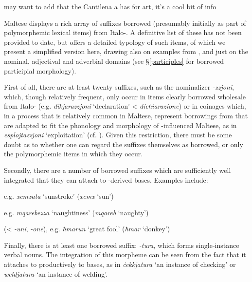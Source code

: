 \documentclass[output=paper]{langsci/langscibook}
\begin{document}
may want to add that the Cantilena a has  for art, it's a cool bit of info

\largerpage
Maltese displays a rich array of  suffixes borrowed (presumably initially as part of polymorphemic lexical items) from Italo-. A definitive list of these has not been provided to date, but \cite{Saade2019} offers a detailed typology of such items, of which we present a simplified version here, drawing also on examples from \cite{brincatmifsud2015}, and  just on the nominal, adjectival and adverbial domains (see §\ref{participles} for borrowed participial morphology).


First of all, there are at least twenty suffixes, such as the nominalizer \textit{-zzjoni}, which, though relatively frequent, only occur in items clearly borrowed wholesale from Italo- (e.g. \textit{dikjarazzjoni} `declaration' <  \textit{dichiarazione}) or in coinages which, in a process that is relatively common in Maltese, represent borrowings from  that are adapted to fit the phonology and morphology of -influenced Maltese, as in \textit{esplojtazzjoni} `exploitation' (cf. \citealt{gattfabri2018}). Given this restriction, there must be some doubt as to whether one can regard the suffixes themselves as borrowed, or only the polymorphemic items in which they occur.

Secondly, there are a number of borrowed suffixes which are sufficiently well integrated that they can attach to -derived bases. Examples include:

\begin{description}[font=\normalfont,noitemsep]
	\item[\textit{-ata},] e.g. \textit{xemxata} `sunstroke' (\textit{xemx} `sun')
    \item[\textit{-ezza},] e.g. \textit{mqarebezza} `naughtiness' (\textit{mqareb} `naughty')
    \item[\textit{-un}] (<  \textit{-uni},  \textit{-one}), e.g. \textit{ħmarun} `great fool' (\textit{ħmar} `donkey')
\end{description}


Finally, there is at least one borrowed suffix: \textit{-tura}, which forms single-instance verbal nouns. The integration of this morpheme can be seen from the fact that it attaches to productively to  bases, as in \textit{ċekkjatura} `an instance of checking' or \textit{weldjatura} `an instance of welding'.
\end{document}

